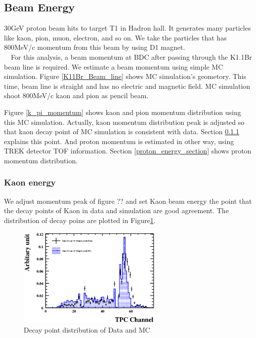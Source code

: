    \subsection{Beam Energy}
 
   30GeV proton beam hits to target T1 in Hadron hall.
   It generates many particles like kaon, pion, muon, electron, and
   so on.
   We take the particles that has 800MeV/c momentum from this beam by
   using D1 magnet.\\
   \ \ For this analysis, a beam momentum at BDC after passing through the
   K1.1Br beam line is required.
   We estimate a beam momentum using simple MC simulation.
   Figure \ref{K11Br_Beam_line} shows MC simulation's geometory.
   This time, beam line is straight and has no electric and magnetic
   field.
   MC simulation shoot 800MeV/c kaon and pion as pencil beam.

   Figure \ref{k_pi_momentum} shows kaon and pion momentum distribution
   using this MC simulation.
   Actually, kaon momentum distribution peak is adjusted so that kaon
   decay point of MC simulation is consistent with data.
   Section \ref{kaon_energy_section} explains this point.
   And proton momentum is estimated in other way, using TREK detector
   TOF information.
   Section \ref{proton_energy_section} shows proton momentum distribution.

   \subsubsection{Kaon energy}\label{kaon_energy_section}

We adjust momentum peak of figure ?? and set Kaon beam energy  the point that the decay points of Kaon in data and simulation are good agreement. The distribution of decay poins are plotted in Figure\ref{DecayPoint_hough}.
\begin{figure}[!htb]
  \begin{center}
    \includegraphics[width=70mm]{fig/cdp_hough.eps}
  \end{center}
  \caption{Decay point distribution of Data and MC}
  \label{DecayPoint_hough}
\end{figure}

